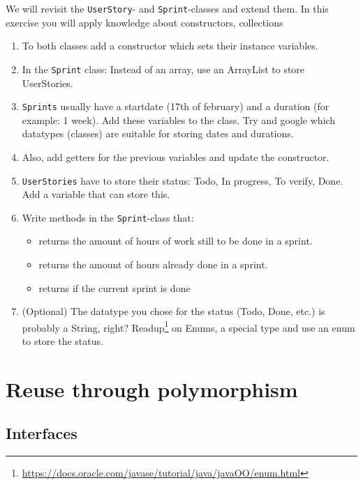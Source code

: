      We will revisit the \texttt{UserStory}- and \texttt{Sprint}-classes and extend them.
     In this exercise you will apply knowledge about constructors, collections
         \begin{enumerate}
             \item To both classes add a constructor which sets their instance variables.
             \item In the \texttt{Sprint} class: Instead of an array, use an ArrayList to store UserStories.
             \item \texttt{Sprints} usually have a startdate (17th of february) and a duration (for example: 1 week). Add these variables to the class. Try and google which datatypes (classes) are suitable for storing dates and durations.
             \item Also, add getters for the previous variables and update the constructor.
             \item \texttt{UserStories} have to store their status: Todo, In progress, To verify, Done. Add a variable that can store this.
             \item Write methods in the \texttt{Sprint}-class that:
             \begin{itemize}
                  \item returns the amount of hours of work still to be done in a sprint.
                  \item returns the amount of hours already done in a sprint.
                  \item returns if the current sprint is done
             \end{itemize}
             \item (Optional) The datatype you chose for the status (Todo, Done, etc.) is probably a String, right? Readup\footnote{\href{https://docs.oracle.com/javase/tutorial/java/javaOO/enum.html}{https://docs.oracle.com/javase/tutorial/java/javaOO/enum.html}} on Enums, a special type and use an enum to store the status.
         \end{enumerate}


\chapter{Reuse through polymorphism}

    \section{Interfaces}	    
